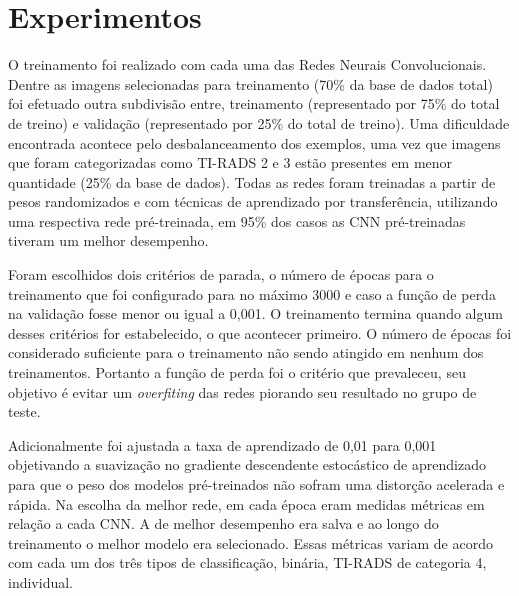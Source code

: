 \documentclass[12pt]{article}
\begin{document}
\section{Experimentos}
O treinamento foi realizado com cada uma das Redes Neurais Convolucionais. Dentre as imagens selecionadas para treinamento (70\% da base de dados total) foi efetuado outra subdivisão entre, treinamento (representado por 75\% do total de treino) e validação (representado por 25\% do total de treino). Uma dificuldade encontrada acontece pelo desbalanceamento dos exemplos, uma vez que imagens que foram categorizadas como TI-RADS 2 e 3 estão presentes em menor quantidade (25\% da base de dados). Todas as redes foram treinadas a partir de pesos randomizados e com técnicas de aprendizado por transferência, utilizando uma respectiva rede pré-treinada, em 95\% dos casos as CNN pré-treinadas tiveram um melhor desempenho.

Foram escolhidos dois critérios de parada, o número de épocas para o treinamento que foi configurado para no máximo 3000 e caso a função de perda na validação fosse menor ou igual a 0,001. O treinamento termina quando algum desses critérios for estabelecido, o que acontecer primeiro. O número de épocas foi considerado suficiente para o treinamento não sendo atingido em nenhum dos treinamentos. Portanto a função de perda foi o critério que prevaleceu, seu objetivo é evitar um \textit{overfiting} das redes piorando seu resultado no grupo de teste.

Adicionalmente foi ajustada a taxa de aprendizado de 0,01 para 0,001 objetivando a suavização no gradiente descendente estocástico de aprendizado para que o peso dos modelos pré-treinados não sofram uma distorção acelerada e rápida. Na escolha da melhor rede, em cada época eram medidas métricas em relação a cada CNN. A de melhor desempenho era salva e ao longo do treinamento o melhor modelo era selecionado. Essas métricas variam de acordo com cada um dos três tipos de classificação, binária, TI-RADS de categoria 4, individual.
\end{document}
